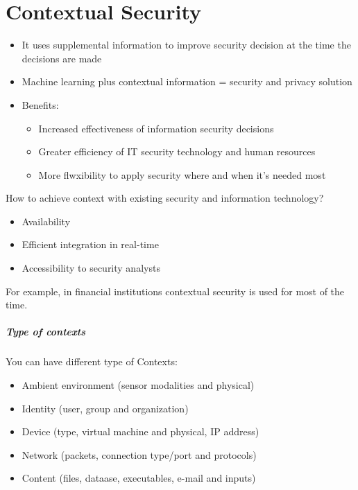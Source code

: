 \chapter{Contextual Security}

\begin{itemize}
  \item It uses supplemental information to improve security decision at the
time the decisions are made
  \item Machine learning plus contextual information = security and privacy
solution
  \item Benefits:
  \begin{itemize}
    \item Increased effectiveness of information security decisions
    \item Greater efficiency of IT security technology and human resources
    \item More flwxibility to apply security where and when it's needed most
  \end{itemize}
\end{itemize}

How to achieve context with existing security and information technology?
\begin{itemize}
  \item Availability
  \item Efficient integration in real-time
  \item Accessibility to security analysts
\end{itemize}

For example, in financial institutions contextual security is used for most of
the time.

\paragraph*{Type of contexts} You can have different type of Contexts:
\begin{itemize}
  \item Ambient environment (sensor modalities and physical)
  \item Identity (user, group and organization)
  \item Device (type, virtual machine and physical, IP address)
  \item Network (packets, connection type/port and protocols)
  \item Content (files, dataase, executables, e-mail and inputs)
\end{itemize}

